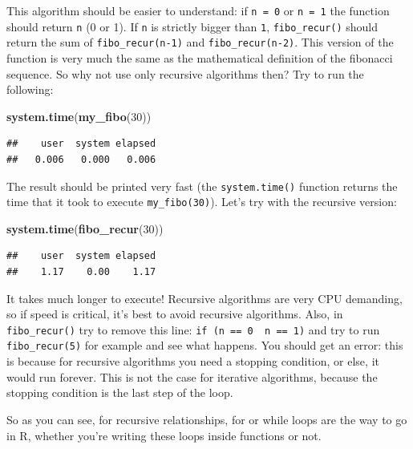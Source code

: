 \documentclass[]{gitbook}
\newenvironment{Shaded}{\begin{snugshade}}{\end{snugshade}}
\newcommand{\DecValTok}[1]{\textcolor[rgb]{0.00,0.00,0.81}{#1}}
\newcommand{\KeywordTok}[1]{\textcolor[rgb]{0.13,0.29,0.53}{\textbf{#1}}}
\newcommand{\NormalTok}[1]{#1}
\begin{document}
This algorithm should be easier to understand: if \texttt{n\ =\ 0} or \texttt{n\ =\ 1} the function should return \texttt{n}
(0 or 1). If \texttt{n} is strictly bigger than \texttt{1}, \texttt{fibo\_recur()} should return the sum of
\texttt{fibo\_recur(n-1)} and \texttt{fibo\_recur(n-2)}. This version of the function is very much the same as the
mathematical definition of the fibonacci sequence. So why not use only recursive algorithms
then? Try to run the following:

\begin{Shaded}
\begin{Highlighting}[]
\KeywordTok{system.time}\NormalTok{(}\KeywordTok{my_fibo}\NormalTok{(}\DecValTok{30}\NormalTok{))}
\end{Highlighting}
\end{Shaded}

\begin{verbatim}
##    user  system elapsed 
##   0.006   0.000   0.006
\end{verbatim}

The result should be printed very fast (the \texttt{system.time()} function returns the time that it took
to execute \texttt{my\_fibo(30)}). Let's try with the recursive version:

\begin{Shaded}
\begin{Highlighting}[]
\KeywordTok{system.time}\NormalTok{(}\KeywordTok{fibo_recur}\NormalTok{(}\DecValTok{30}\NormalTok{))}
\end{Highlighting}
\end{Shaded}

\begin{verbatim}
##    user  system elapsed 
##    1.17    0.00    1.17
\end{verbatim}

It takes much longer to execute! Recursive algorithms are very CPU demanding, so if speed is
critical, it's best to avoid recursive algorithms. Also, in \texttt{fibo\_recur()} try to remove this line:
\texttt{if\ (n\ ==\ 0\ \textbar{}\textbar{}\ n\ ==\ 1)} and try to run \texttt{fibo\_recur(5)} for example and see what happens. You should
get an error: this is because for recursive algorithms you need a stopping condition, or else,
it would run forever. This is not the case for iterative algorithms, because the stopping
condition is the last step of the loop.

So as you can see, for recursive relationships, for or while loops are the way to go in R, whether
you're writing these loops inside functions or not.
\end{document}
